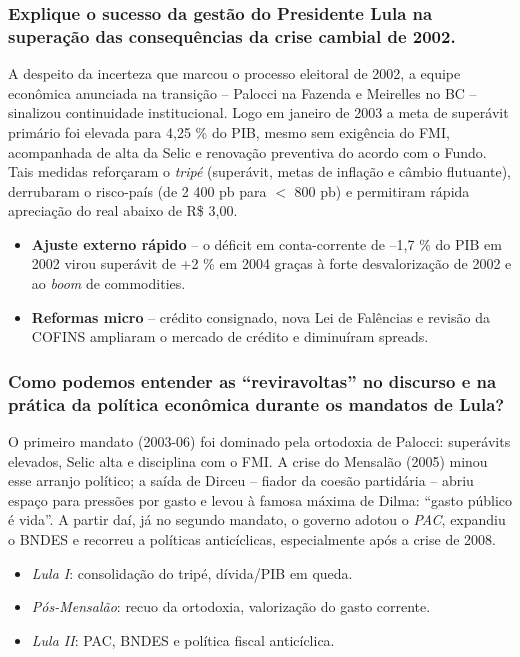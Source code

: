 \documentclass[a4paper,12pt]{article}[abntex2]
\begin{document}
\subsubsection{\textbf{Explique o sucesso da gestão do Presidente Lula na superação das consequências da crise cambial de 2002.}}

A despeito da incerteza que marcou o processo eleitoral de 2002, a equipe econômica anunciada na transição – Palocci na Fazenda e Meirelles no BC – sinalizou continuidade institucional. Logo em janeiro de 2003 a meta de superávit primário foi elevada para 4{,}25 \% do PIB, mesmo sem exigência do FMI, acompanhada de alta da Selic e renovação preventiva do acordo com o Fundo. Tais medidas reforçaram o \emph{tripé} (superávit, metas de inflação e câmbio flutuante), derrubaram o risco-país (de 2 400 pb para \(<\) 800 pb) e permitiram rápida apreciação do real abaixo de R\$ 3,00. 

\begin{itemize}
  \item \textbf{Ajuste externo rápido} – o déficit em conta-corrente de –1,7 \% do PIB em 2002 virou superávit de +2 \% em 2004 graças à forte desvalorização de 2002 e ao \emph{boom} de commodities. 
  \item \textbf{Reformas micro} – crédito consignado, nova Lei de Falências e revisão da COFINS ampliaram o mercado de crédito e diminuíram spreads. 
\end{itemize}

\subsubsection{\textbf{Como podemos entender as “reviravoltas” no discurso e na prática da política econômica durante os mandatos de Lula?}}

O primeiro mandato (2003-06) foi dominado pela ortodoxia de Palocci: superávits elevados, Selic alta e disciplina com o FMI. A crise do Mensalão (2005) minou esse arranjo político; a saída de Dirceu – fiador da coesão partidária – abriu espaço para pressões por gasto e levou à famosa máxima de Dilma: “gasto público é vida”. A partir daí, já no segundo mandato, o governo adotou o \emph{PAC}, expandiu o BNDES e recorreu a políticas anticíclicas, especialmente após a crise de 2008. 

\begin{itemize}
  \item \emph{Lula I}: consolidação do tripé, dívida/PIB em queda. 
  \item \emph{Pós-Mensalão}: recuo da ortodoxia, valorização do gasto corrente. 
  \item \emph{Lula II}: PAC, BNDES e política fiscal anticíclica. 
\end{itemize}
\end{document}
